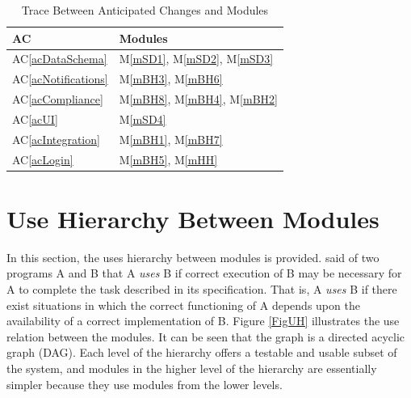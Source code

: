 \documentclass[12pt, titlepage]{article}
\newcommand{\acref}[1]{AC\ref{#1}}
\newcommand{\mref}[1]{M\ref{#1}}
\begin{document}
\begin{table}[H]
\centering
\begin{tabular}{p{} p{}}
\toprule
\textbf{AC} & \textbf{Modules}\\
\midrule
\acref{acDataSchema} & \mref{mSD1}, \mref{mSD2}, \mref{mSD3}\\
\acref{acNotifications} & \mref{mBH3}, \mref{mBH6}\\
\acref{acCompliance} & \mref{mBH8}, \mref{mBH4}, \mref{mBH2}\\
\acref{acUI} & \mref{mSD4}\\
\acref{acIntegration} & \mref{mBH1}, \mref{mBH7}\\
\acref{acLogin} & \mref{mBH5}, \mref{mHH}\\
\bottomrule
\end{tabular}
\caption{Trace Between Anticipated Changes and Modules}
\label{TblACT}
\end{table}

\newpage

\section{Use Hierarchy Between Modules} \label{SecUse}

In this section, the uses hierarchy between modules is
provided. \citet{Parnas1978} said of two programs A and B that A {\em uses} B if
correct execution of B may be necessary for A to complete the task described in
its specification. That is, A {\em uses} B if there exist situations in which
the correct functioning of A depends upon the availability of a correct
implementation of B.  Figure \ref{FigUH} illustrates the use relation between
the modules. It can be seen that the graph is a directed acyclic graph
(DAG). Each level of the hierarchy offers a testable and usable subset of the
system, and modules in the higher level of the hierarchy are essentially simpler
because they use modules from the lower levels.


\end{document}
